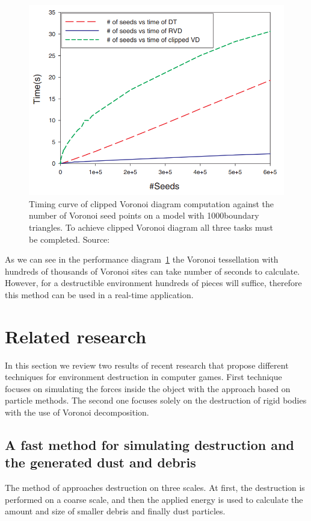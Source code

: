  \begin{figure}
    \centering
    \includegraphics[width=\textwidth]{img/clipped}
    \caption{Timing curve of clipped Voronoi diagram computation against the number of Voronoi seed points on a model with 1000boundary triangles.  To achieve clipped Voronoi diagram all three tasks must be completed. Source: \citet{yan2010efficient}}
    \label{fig:vorocliptime}
\end{figure}

As we can see in the performance diagram~\cref{fig:vorocliptime} the Voronoi tessellation with hundreds of thousands of Voronoi sites can take number of seconds to calculate. However, for a destructible environment hundreds of pieces will suffice, therefore this method can be used in a real-time application.  

\section{Related research}
In this section we review two results of recent research that propose different techniques for environment destruction in computer games. First technique focuses on simulating the forces inside the object with the approach based on particle methods. The second one focuses solely on the destruction of rigid bodies with the use of Voronoi decomposition.

\subsection{A fast method for simulating destruction and the generated dust
and debris}
\label{sec:edem}
The method of \citet{edem} approaches destruction on three scales. At first, the destruction is performed on a coarse scale, and then the applied energy is used to calculate the amount and size of smaller debris and finally dust particles.

